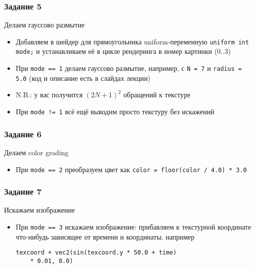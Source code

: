 \documentclass{beamer}
\begin{document}
\begin{frame}[fragile]
\frametitle{Задание 5}
Делаем гауссово размытие
\begin{itemize}
\item Добавляем в шейдер для прямоугольника uniform-переменную \verb|uniform int mode;| и устанавливаем её в цикле рендеринга в номер картинки (0..3)
\pause
\item При \verb|mode == 1| делаем гауссово размытие, например, с \verb|N = 7| и \verb|radius = 5.0| (код и описание есть в слайдах лекции)
\pause
\item N.B.: у вас получится \begin{math}(2N+1)^2\end{math} обращений к текстуре
\pause
\item При \verb|mode != 1| всё ещё выводим просто текстуру без искажений
\end{itemize}
\end{frame}

\begin{frame}[fragile]
\frametitle{Задание 6}
Делаем color grading
\begin{itemize}
\item При \verb|mode == 2| преобразуем цвет как \verb|color = floor(color / 4.0) * 3.0|
\end{itemize}
\end{frame}

\begin{frame}[fragile]
\frametitle{Задание 7}
Искажаем изображение
\begin{itemize}
\item При \verb|mode == 3| искажаем изображение: прибавляем к текстурной координате что-нибудь зависящее от времени и координаты, например 
\begin{verbatim}
texcoord + vec2(sin(texcoord.y * 50.0 + time)
    * 0.01, 0.0)
\end{verbatim}
\end{itemize}
\end{frame}
\end{document}
